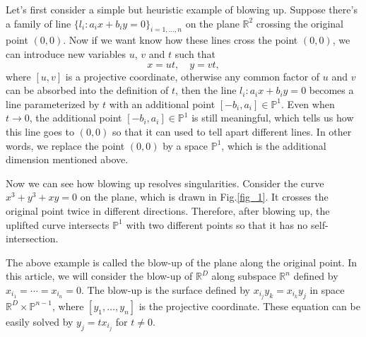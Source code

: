\documentclass[12pt]{article}
\theoremstyle{definition}
\theoremstyle{plain}
\begin{document}
Let's first consider a simple but heuristic example of blowing up. 
Suppose there's a family of line $\{l_i: a_ix+b_iy=0\}_{i=1,\dots,n}$ on the plane 
$\mathbb R^2$
crossing the original point $(0,0)$. 
Now if we want know how these lines cross the point $(0,0)$, we can introduce 
new variables $u$, $v$ and $t$ such that
\[
	x=ut,\quad y=vt,
\] 
where $[u,v]$ is a projective coordinate, otherwise any common factor of $u$ and $v$ can be 
absorbed into the definition of $t$, then the line $l_i:a_ix+b_iy=0$ becomes a line parameterized 
by $t$ with an additional point $[-b_i,a_i]\in \mathbb P^1$. Even when $t\to 0$, the additional point
$[-b_i,a_i]\in \mathbb P^1$ is still meaningful, which tells us how this line goes to $(0,0)$
so that it can used to tell apart different lines.
In other words, we replace the point $(0,0)$ by a space $\mathbb P^1$, which is the additional
dimension mentioned above. 

Now we can see how blowing up resolves singularities. 
Consider the curve $x^3+y^3+xy=0$ on the plane, which is drawn in Fig.\ref{fig_1}.
It crosses the original point twice in different 
directions. Therefore, after blowing up, the uplifted curve intersects $\mathbb P^1$ with two 
different points so that it has no self-intersection. 

The above example is called the blow-up of the plane along the original point.
In this article, we will consider the blow-up of $\mathbb R^D$
along subspace $\mathbb R^n$ defined by $x_{i_1}=\cdots=x_{i_n}=0$. 
The blow-up is the surface defined by $x_{i_j}y_k=x_{i_k}y_j$ in space 
$\mathbb R^{D}\times \mathbb P^{n-1}$,
where $[y_1,\dots,y_n]$ is the projective coordinate. These equation can be easily
solved by $y_j=tx_{i_j}$ for $t\neq 0$.

\end{document}
